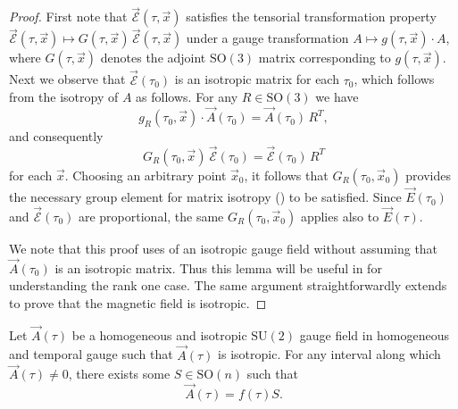 \begin{proof}
First note that $\vec{\mathcal{E}}(\tau,\vec{x})$ satisfies the tensorial transformation property $\vec{\mathcal{E}}(\tau,\vec{x})\mapsto G(\tau,\vec{x})\,\vec{\mathcal{E}}(\tau,\vec{x})$ under a gauge transformation $A\mapsto g(\tau,\vec{x})\cdot A$, where $G(\tau,\vec{x})$ denotes the adjoint $\mathrm{SO}(3)$ matrix corresponding to $g(\tau,\vec{x})$. Next we observe that $\vec{\mathcal{E}}(\tau_{0})$ is an isotropic matrix for each $\tau_{0}$, which follows from the isotropy of $A$ as follows. For any $R\in\mathrm{SO}(3)$ we have 
\begin{equation}
g_{R}(\tau_{0},\vec{x})\cdot\vec{A}(\tau_{0})=\vec{A}(\tau_{0})\,R^{T},\label{eq:isotropy-A_sp}
\end{equation}
 and consequently 
\[
G_{R}(\tau_{0},\vec{x})\,\vec{\mathcal{E}}(\tau_{0})=\vec{\mathcal{E}}(\tau_{0})\,R^{T}
\]
 for each $\vec{x}$. Choosing an arbitrary point $\vec{x}_{0}$, it follows that $G_{R}(\tau_{0},\vec{x}_{0})$ provides the necessary group element for matrix isotropy () to be satisfied. Since $\vec{E}(\tau_{0})$ and $\vec{\mathcal{E}}(\tau_{0})$ are proportional, the same $G_{R}(\tau_{0},\vec{x}_{0})$ applies also to $\vec{E}(\tau)$. 

We note that this proof uses  of an isotropic gauge field without assuming that $\vec{A}(\tau_{0})$ is an isotropic matrix. Thus this lemma will be useful in  for understanding the rank one case. The same argument straightforwardly extends to prove that the magnetic field is isotropic.
\end{proof}
\begin{lem}
\label{lem:non-analytic}Let $\vec{A}(\tau)$ be a homogeneous and isotropic $\mathrm{SU}(2)$ gauge field in homogeneous and temporal gauge such that $\vec{A}(\tau)$ is isotropic. For any interval along which $\vec{A}(\tau)\neq0$, there exists some $S\in\mathrm{SO}(n)$ such that 
\[
\vec{A}(\tau)=f(\tau)S.
\]
\end{lem}

